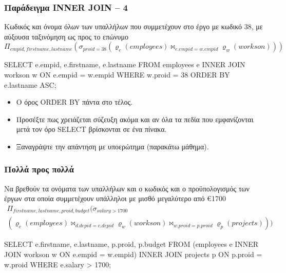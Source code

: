 \begin{frame}
\frametitle{Παράδειγμα  {\en INNER JOIN} -- 4}

\vspace*{-0.5cm}
\begin{exampleblock}{\small Κωδικός και όνομα όλων των υπαλλήλων
             που συμμετέχουν στο έργο με κωδικό 38,
             με αύξουσα ταξινόμηση ως προς το επώνυμο}
\en
\vspace*{-0.5cm}
\[
  \Pi_{empid, firstname, lastname}
  (\sigma_{proid = 38}
    ( \varrho_{e} (employees) \bowtie_{e.empid=w.empid} \varrho_{w} (workson) )
  )
\]
\pause
\vspace*{-0.6cm}
\en
\begin{SQL}
  SELECT e.empid, e.firstname, e.lastname
    FROM employees e INNER JOIN workson w
         ON e.empid = w.empid
   WHERE w.proid = 38
ORDER BY e.lastname ASC;
\end{SQL}
\end{exampleblock}
\el
\begin{minipage}{\wE}
\begin{itemize}
  \item Ο όρος {\sq ORDER BY} πάντα στο τέλος.
  \item Προσέξτε πως χρειάζεται {\bb σύζευξη} ακόμα και αν όλα τα πεδία
        που εμφανίζονται μετά τον όρο {\sq SELECT} βρίσκονται σε ένα πίνακα.
  \item Ξαναγράψτε την απάντηση με υποερώτημα (παρακάτω μάθημα).      
\end{itemize}
\end{minipage}
\end{frame}


\begin{frame}
\frametitle{Πολλά προς πολλά}
\begin{minipage}{\wE}
\begin{exampleblock}{\small Να βρεθούν τα ονόματα των υπαλλήλων και ο κωδικός και ο προϋπολογισμός των
              έργων στα οποία συμμετέχουν  υπάλληλοι με μισθό μεγαλύτερο από \euro1700 }
\en
\vspace{-0.5cm}
\[
\begin{array}{l}
  \Pi_{firstname, lastname, proid, budget}
  (\sigma_{salary>1700}                    \\
    ( \varrho_{e} (employees) \bowtie_{d.depid=e.depid} \varrho_{w} (workson)
      \bowtie_{w.proid=p.proid} \varrho_{p} (projects)   )
  )
\end{array}
\]
\pause
\vspace{-0.5cm}
\en
\begin{SQL}
  SELECT e.firstname, e.lastname, p.proid, p.budget
    FROM (employees e INNER JOIN workson w
         ON e.empid = w.empid)
                      INNER JOIN projects p
         ON p.proid = w.proid
   WHERE e.salary > 1700;
\end{SQL}
\el
\end{exampleblock}
\end{minipage}
\end{frame}

